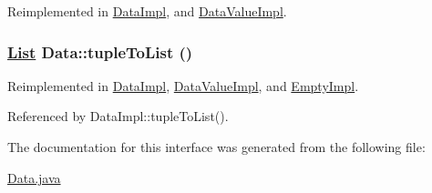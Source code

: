Reimplemented in \hyperlink{classDataImpl_a3}{Data\-Impl}, and \hyperlink{classDataValueImpl_a1}{Data\-Value\-Impl}.\hypertarget{interfaceData_a1}{
\subsubsection[tupleToList]{\setlength{\rightskip}{0pt plus 5cm}\hyperlink{interfaceList}{List} Data::tuple\-To\-List ()}}
\label{interfaceData_a1}




Reimplemented in \hyperlink{classDataImpl_a1}{Data\-Impl}, \hyperlink{classDataValueImpl_a2}{Data\-Value\-Impl}, and \hyperlink{classEmptyImpl_a1}{Empty\-Impl}.

Referenced by Data\-Impl::tuple\-To\-List().



The documentation for this interface was generated from the following file:\begin{CompactItemize}
\item 
\hyperlink{Data_8java-source}{Data.java}\end{CompactItemize}
